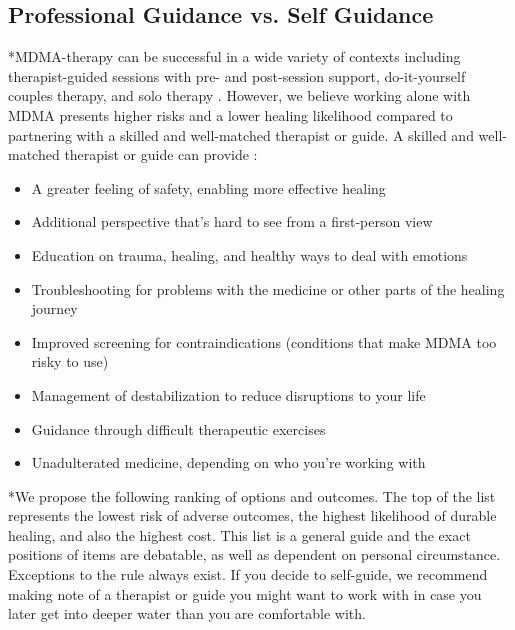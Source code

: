 \documentclass[12pt,letterpaper]{article}
\begin{document}
\subsection{Professional Guidance vs. Self Guidance}
\label{profressionalVSSelf}
*MDMA-therapy can be successful in a wide variety of contexts including therapist-guided sessions with pre- and post-session support, do-it-yourself couples therapy, and solo therapy \cite{mitchellMDMAClinicalTrial2,colbertEvenings,hillsSolo}. However, we believe working alone with MDMA presents higher risks and a lower healing likelihood compared to partnering with a skilled and well-matched therapist or guide. A skilled and well-matched therapist or guide can provide \cite{mithoeferManual}:
\begin{itemize}
    \item A greater feeling of safety, enabling more effective healing
    \item Additional perspective that's hard to see from a first-person view
    \item Education on trauma, healing, and healthy ways to deal with emotions
    \item Troubleshooting for problems with the medicine or other parts of the healing journey
    \item Improved screening for contraindications (conditions that make MDMA too risky to use)
    \item Management of destabilization to reduce disruptions to your life
    \item Guidance through difficult therapeutic exercises 
    \item Unadulterated medicine, depending on who you're working with
\end{itemize}
*We propose the following ranking of options and outcomes. The top of the list represents the lowest risk of adverse outcomes, the highest likelihood of durable healing, and also the highest cost. This list is a general guide and the exact positions of items are debatable, as well as dependent on personal circumstance. Exceptions to the rule always exist. If you decide to self-guide, we recommend making note of a therapist or guide you might want to work with in case you later get into deeper water than you are comfortable with.
\end{document}
